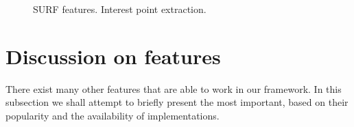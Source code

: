 
\begin{figure}
    \centering
    \qquad
    
    \caption{SURF features. Interest point extraction.}
    \label{fig:surf_features}
\end{figure}


\section{Discussion on features}

There exist many other features that are able to work in our framework. In this subsection we shall attempt to briefly present the most important, based on their popularity and the availability of implementations. 

